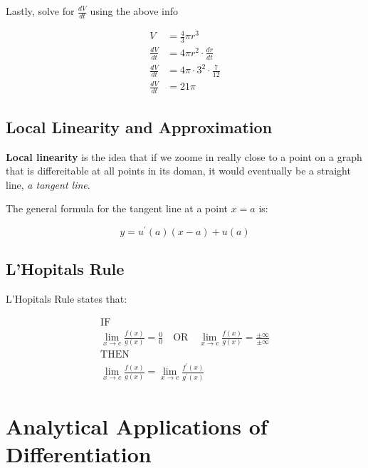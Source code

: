 \documentclass[12pt]{article}
\begin{document}
\begin{enumerate}
            Lastly, solve for $\frac{dV}{dt}$ using the above info

            \[
                \begin{aligned}
                    V &= \frac{4}{3}\pi r^3 \\
                    \frac{dV}{dt} &= 4\pi r^2 \cdot \frac{dr}{dt} \\
                    \frac{dV}{dt} &= 4\pi \cdot 3^2 \cdot \frac{7}{12} \\
                    \frac{dV}{dt} &= 21\pi
                \end{aligned}    
            \]

        \end{enumerate}

        \subsection{Local Linearity and Approximation}

        \textbf{Local linearity} is the idea that if we zoome in really close to a point on a graph that is differeitable at all points
        in its doman, it would eventually be a straight line, \textit{a tangent line}.

        The general formula for the tangent line at a point $x = a$ is:

        \[
            y = u^{\prime}(a)(x - a) + u(a)  
        \]

        \subsection{L'Hopitals Rule}

        \noindent L'Hopitals Rule states that:

        \begin{gather*}
            \text{IF} \\
            \lim_{x \to c} \frac{f(x)}{g(x)} = \frac{0}{0} \quad \text{OR} \quad \lim_{x \to c} \frac{f(x)}{g(x)} = \frac{\pm\infty}{\pm\infty}\\
            \text{THEN} \\
            \lim_{x \to c} \frac{f(x)}{g(x)} = \lim_{x \to c} \frac{f^{\prime}(x)}{g^{\prime}(x)}
        \end{gather*}

        \section{Analytical Applications of Differentiation}
\end{document}
